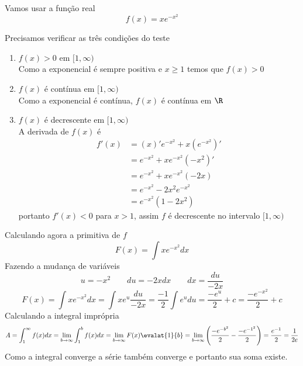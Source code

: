 \documentclass[a4paper,12pt,fleqn]{article}
\begin{document}
\begin{answer}
  Vamos usar a função real
  \[
    f(x) = x e^{-x^2}
  \]

  Precisamos verificar as três condições do teste
  \begin{enumerate}[label=\roman*)]
    \item \(f(x)>0\) em \([1, \infty)\) \\[2mm]
      Como a exponencial é sempre positiva e \(x\geq 1\) temos que \(f(x)>0\)

  \item \(f(x)\) é contínua em \([1, \infty)\) \\[2mm]
    Como a exponencial é contínua, \(f(x)\) é contínua em \(\R\)

  \item \(f(x)\) é decrescente em  \([1, \infty)\) \\[2mm]
    A derivada de \(f(x)\) é
    \begin{align*}
    f'(x)
    & = (x)'e^{-x^2} + x \left(e^{-x^2}\right)' \\
    & = e^{-x^2} + x e^{-x^2} \left(-x^2\right)' \\
    & = e^{-x^2} + x e^{-x^2} \left(-2x\right) \\
    & = e^{-x^2} -2 x^2 e^{-x^2} \\
    & = e^{-x^2}\left(1 -2 x^2\right)
    \end{align*}
    portanto \(f'(x)<0\) para \(x>1\), assim \(f\) é decrescente no intervalo \([1, \infty)\)
  \end{enumerate}
  Calculando agora a primitiva de \(f\)
  \[
    F(x) = \int x e^{-x^2} dx
  \]
  Fazendo a mudança de variáveis
  \[
    u = -x^2
    \qquad
    du = -2xdx
    \qquad
    dx = \frac{du}{-2x}
  \]
  \[
    F(x)
    = \int x e^{-x^2} dx
    = \int x e^{u} \frac{du}{-2x}
    = \frac{-1}{2} \int e^{u} du
    = \frac{-e^u}{2} + c
    = \frac{-e^{-x^2}}{2} + c
  \]
  Calculando a integral imprópria
  \[
    A
    = \int_1^\infty f(x) dx
    = \lim_{b\to\infty}\int_1^b f(x)dx
    = \lim_{b\to\infty} F(x)\evalat{1}{b}
    = \lim_{b\to\infty} \left(\frac{-e^{-b^2}}{2} - \frac{-e^{-1^2}}{2}\right)
    = \frac{e^{-1}}{2}
    = \frac{1}{2e}
  \]
  Como a integral converge a série também converge e portanto sua soma existe.
\end{answer}

\end{document}
